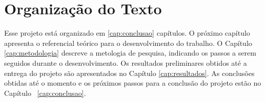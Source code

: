 \section{Organização do Texto}

Esse projeto está organizado em \ref{cap:conclusao} capítulos. O próximo capítulo apresenta o referencial teórico para o desenvolvimento do trabalho. %
O Capítulo \ref{cap:metodologia} descreve a metologia de pesquisa, indicando os passos a serem seguidos durante o desenvolvimento. Os resultados preliminares obtidos até a entrega do projeto são apresentados no Capítulo \ref{cap:resultados}. As conclusões obtidas até o momento e os próximos passos para a conclusão do projeto estão no Capítulo ~\ref{cap:conclusao}.




